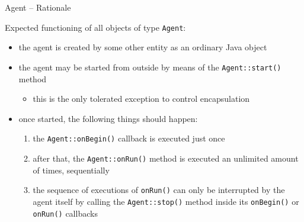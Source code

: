 \documentclass[presentation]{beamer}\mode<presentation>{\usetheme{AMSCesenaPurpleAndGold}}
\begin{document}
\begin{frame}[allowframebreaks]{Agent -- Rationale}
    
        
    
    Expected functioning of all objects of type \alert{\texttt{Agent}}:
    \vspace{.5cm}
    \begin{itemize}
        \item the agent is created by some other entity as an ordinary Java object
        
        \vspace{.5cm}
        
        \item the agent may be started from outside by means of the \texttt{Agent::\alert{start()}} method 
        \begin{itemize}
            \item this is the only tolerated exception to control encapsulation
        \end{itemize}
        
        \vspace{.5cm}
        
        \item once started, the following things should happen:
        \begin{enumerate}
            \item the \texttt{Agent::\alert{onBegin()}} callback is executed \alert{just once}
            
            \item \alert{after} that, the \texttt{Agent::\alert{onRun()}} method is executed an \alert{unlimited} amount of times, sequentially
    
            \item the sequence of executions of \texttt{onRun()} can only be interrupted by the agent itself by calling the \texttt{Agent::\alert{stop()}} method inside its \texttt{onBegin()} or \texttt{onRun()} callbacks
        \end{enumerate}
        
        \framebreak
        
        

\end{itemize}
\end{frame}
\end{document}
